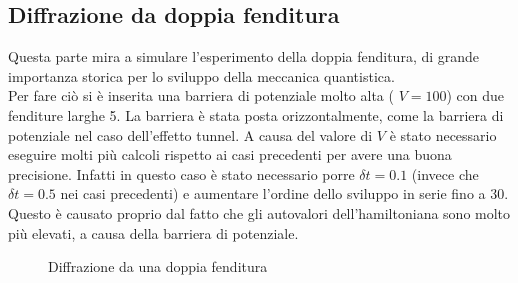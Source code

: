  \subsection{Diffrazione da doppia fenditura}
 Questa parte mira a simulare l'esperimento della doppia fenditura, di grande importanza storica per lo sviluppo della meccanica quantistica.\\
 Per fare ciò si è inserita una barriera di potenziale molto alta ( $V = 100$) con due fenditure larghe 5. La barriera è stata posta orizzontalmente, come la barriera di potenziale nel caso dell'effetto tunnel.
 A causa del valore di $V$ è stato necessario eseguire molti più calcoli rispetto ai casi precedenti per avere una buona precisione. Infatti in questo caso
 è stato necessario porre $\delta t = 0.1$ (invece che $\delta t = 0.5 $ nei casi precedenti) e aumentare l'ordine dello sviluppo in serie fino a 30.
 Questo è causato proprio dal fatto che gli autovalori dell'hamiltoniana sono molto più elevati, a causa della barriera di potenziale.
\begin{figure}[!h]
 \centering
 \caption{\small{Diffrazione da una doppia fenditura}}
 
 \end{figure}

